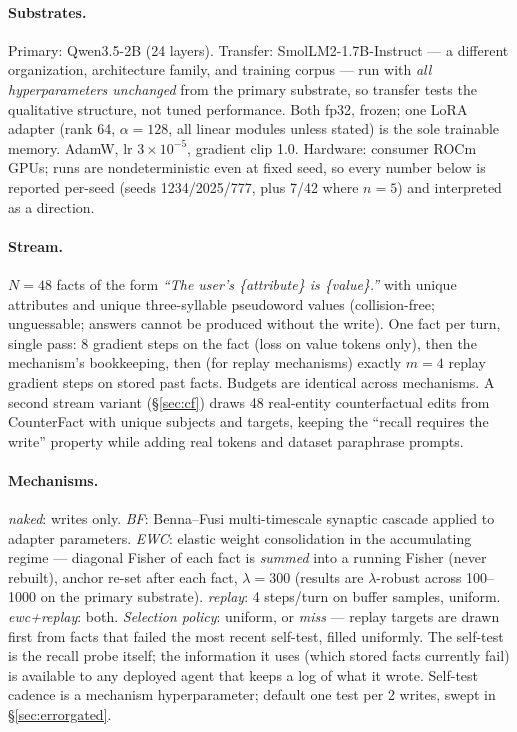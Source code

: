 \documentclass[11pt]{article}
\newcommand{\qwen}{Qwen3.5-2B}
\newcommand{\smol}{SmolLM2-1.7B-Instruct}
\begin{document}
\paragraph{Substrates.} Primary: \qwen{} (24 layers). Transfer: \smol{}
\citep{allal2025smollm2} --- a different organization, architecture family, and training corpus ---
run with \emph{all hyperparameters unchanged} from the primary substrate, so transfer tests the
qualitative structure, not tuned performance. Both fp32, frozen; one LoRA adapter (rank 64,
$\alpha{=}128$, all linear modules unless stated) is the sole trainable memory. AdamW, lr $3\times
10^{-5}$, gradient clip 1.0. Hardware: consumer ROCm GPUs; runs are nondeterministic even at fixed
seed, so every number below is reported per-seed (seeds 1234/2025/777, plus 7/42 where $n{=}5$) and
interpreted as a direction.

\paragraph{Stream.} $N{=}48$ facts of the form \emph{``The user's \{attribute\} is \{value\}.''} with
unique attributes and unique three-syllable pseudoword values (collision-free; unguessable; answers
cannot be produced without the write). One fact per turn, single pass: 8 gradient steps on the fact
(loss on value tokens only), then the mechanism's bookkeeping, then (for replay mechanisms) exactly
$m{=}4$ replay gradient steps on stored past facts. Budgets are identical across mechanisms. A second
stream variant (\S\ref{sec:cf}) draws 48 real-entity counterfactual edits from CounterFact
\citep{meng2022rome} with unique subjects and targets, keeping the ``recall requires the write''
property while adding real tokens and dataset paraphrase prompts.

\paragraph{Mechanisms.} \emph{naked}: writes only. \emph{BF}: Benna--Fusi multi-timescale synaptic
cascade \citep{benna2016} applied to adapter parameters. \emph{EWC}: elastic weight consolidation
\citep{kirkpatrick2017} in the accumulating regime --- diagonal Fisher of each fact is \emph{summed}
into a running Fisher (never rebuilt), anchor re-set after each fact, $\lambda{=}300$ (results are
$\lambda$-robust across 100--1000 on the primary substrate). \emph{replay}: 4 steps/turn on buffer
samples, uniform. \emph{ewc+replay}: both. \emph{Selection policy}: uniform, or \emph{miss} ---
replay targets are drawn first from facts that failed the most recent self-test, filled uniformly.
The self-test is the recall probe itself; the information it uses (which stored facts currently fail)
is available to any deployed agent that keeps a log of what it wrote. Self-test cadence is a
mechanism hyperparameter; default one test per 2 writes, swept in \S\ref{sec:errorgated}.
\end{document}
